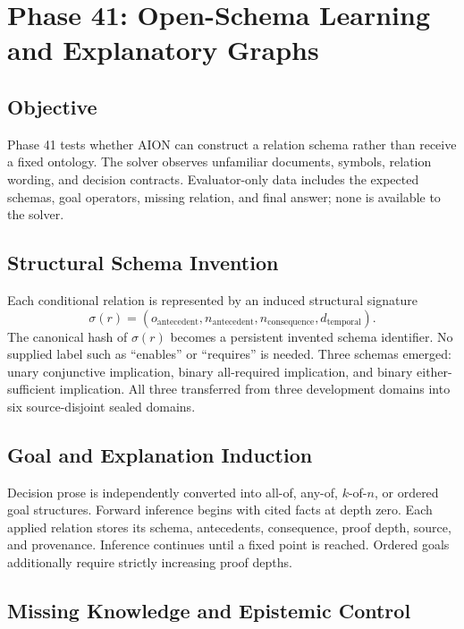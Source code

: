 \section{Phase 41: Open-Schema Learning and Explanatory Graphs}
\label{sec:phase41-open-schema}

\subsection{Objective}

Phase 41 tests whether AION can construct a relation schema rather than receive
a fixed ontology.  The solver observes unfamiliar documents, symbols,
relation wording, and decision contracts.  Evaluator-only data includes the
expected schemas, goal operators, missing relation, and final answer; none is
available to the solver.

\subsection{Structural Schema Invention}

Each conditional relation is represented by an induced structural signature
\[
\sigma(r)=
\left(
o_{\mathrm{antecedent}},
n_{\mathrm{antecedent}},
n_{\mathrm{consequence}},
d_{\mathrm{temporal}}
\right).
\]
The canonical hash of \(\sigma(r)\) becomes a persistent invented schema
identifier.  No supplied label such as ``enables'' or ``requires'' is needed.
Three schemas emerged: unary conjunctive implication, binary all-required
implication, and binary either-sufficient implication.  All three transferred
from three development domains into six source-disjoint sealed domains.

\subsection{Goal and Explanation Induction}

Decision prose is independently converted into all-of, any-of,
\(k\)-of-\(n\), or ordered goal structures.  Forward inference begins with
cited facts at depth zero.  Each applied relation stores its schema,
antecedents, consequence, proof depth, source, and provenance.  Inference
continues until a fixed point is reached.  Ordered goals additionally require
strictly increasing proof depths.

\subsection{Missing Knowledge and Epistemic Control}

